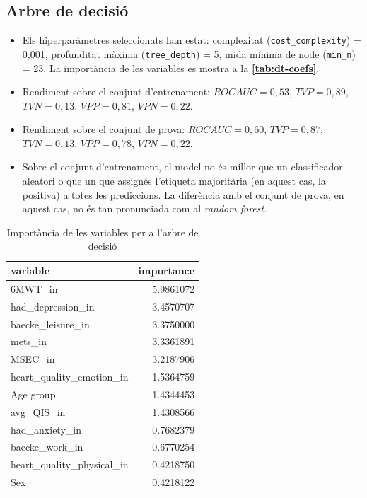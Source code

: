 \documentclass[CAT]{TFUOC}%
\begin{document}
\subsection{Arbre de decisió}\label{arbre-de-decisiuxf3}

\begin{itemize}
\item
  Els hiperparàmetres seleccionats han estat: complexitat (\texttt{cost\_complexity}) = 0,001, profunditat màxima (\texttt{tree\_depth}) = 5, mida mínima de node (\texttt{min\_n}) = 23. La importància de les variables es mostra a la \textbf{\autoref{tab:dt-coefs}}.
\item
  Rendiment sobre el conjunt d'entrenament: \(ROC AUC = 0,53\), \(TVP = 0,89\), \(TVN = 0,13\), \(VPP = 0,81\), \(VPN = 0,22\).
\item
  Rendiment sobre el conjunt de prova: \(ROC AUC = 0,60\), \(TVP = 0,87\), \(TVN = 0,13\), \(VPP = 0,78\), \(VPN = 0,22\).
\item
  Sobre el conjunt d'entrenament, el model no és millor que un classificador aleatori o que un que assignés l'etiqueta majoritària (en aquest cas, la positiva) a totes les prediccions. La diferència amb el conjunt de prova, en aquest cas, no és tan pronunciada com al \emph{random forest}.
\end{itemize}

\begin{table}[t]
\caption{\label{tab:dt-coefs}Importància de les variables per a l'arbre de decisió} 
\fontsize{12.0pt}{14.0pt}\selectfont
\begin{tabular*}{\linewidth}{@{\extracolsep{\fill}}lr}
\toprule
variable & importance \\ 
\midrule\addlinespace[2.5pt]
6MWT\_in & 5.9861072 \\ 
had\_depression\_in & 3.4570707 \\ 
baecke\_leisure\_in & 3.3750000 \\ 
mets\_in & 3.3361891 \\ 
MSEC\_in & 3.2187906 \\ 
heart\_quality\_emotion\_in & 1.5364759 \\ 
Age group & 1.4344453 \\ 
avg\_QIS\_in & 1.4308566 \\ 
had\_anxiety\_in & 0.7682379 \\ 
baecke\_work\_in & 0.6770254 \\ 
heart\_quality\_physical\_in & 0.4218750 \\ 
Sex & 0.4218122 \\ 
\bottomrule
\end{tabular*}
\end{table}
\end{document}
